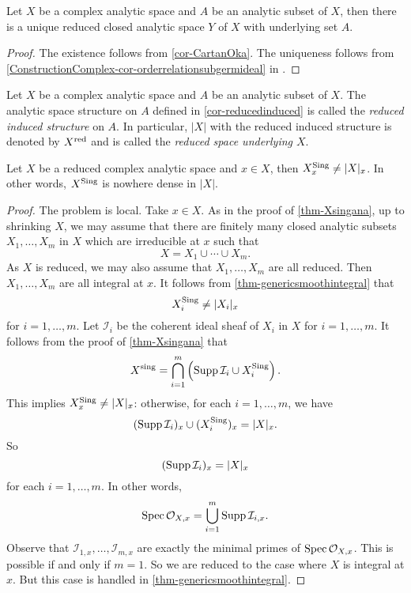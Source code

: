 \begin{corollary}\label{cor-reducedinduced}
    Let $X$ be a complex analytic space and $A$ be an analytic subset of $X$, then there is a unique reduced closed analytic space $Y$ of $X$ with underlying set $A$.
\end{corollary}
\begin{proof}
    The existence follows from \cref{cor-CartanOka}. The uniqueness follows from \cref{ConstructionComplex-cor-orderrelationsubgermideal} in .
\end{proof}

\begin{definition}
    Let $X$ be a complex analytic space and $A$ be an analytic subset of $X$. The analytic space structure on $A$ defined in \cref{cor-reducedinduced} is called the \emph{reduced induced structure} on $A$. In particular, $|X|$ with the reduced induced structure is denoted by $X^{\operatorname{red}}$ and is called the \emph{reduced space underlying $X$}.
\end{definition}

\begin{thm}\label{thm-gensmooth}
    Let $X$ be a reduced complex analytic space and $x\in X$, then $X^{\operatorname{Sing}}_x\neq |X|_x$. In other words, $X^{\operatorname{Sing}}$ is nowhere dense in $|X|$. 
\end{thm}
\begin{proof}
    The problem is local. Take $x\in X$. As in the proof of \cref{thm-Xsingana}, up to shrinking $X$, we may assume that there are finitely many closed analytic subsets $X_1,\ldots,X_m$ in $X$ which are irreducible at $x$ such that 
    \[
        X=X_1\cup\cdots\cup X_m.  
    \]
    As $X$ is reduced, we may also assume that $X_1,\ldots,X_m$ are all reduced. Then $X_1,\ldots,X_m$ are all integral at $x$. It follows from \cref{thm-genericsmoothintegral} that 
    \[
        X_i^{\operatorname{Sing}}\neq |X_i|_x
    \]
    for $i=1,\ldots,m$.
    Let $\mathcal{I}_i$ be the coherent ideal sheaf of $X_i$ in $X$ for $i=1,\ldots,m$. It follows from the proof of \cref{thm-Xsingana} that
    \[
        X^{\operatorname{sing}}=\bigcap_{i=1}^m \left(\operatorname{Supp} \mathcal{I}_i \cup X_i^{\operatorname{Sing}} \right). 
    \]
    This implies $X^{\operatorname{Sing}}_x\neq |X|_x$: otherwise, for each $i=1,\ldots,m$, we have
    \[
        (\operatorname{Supp} \mathcal{I}_i)_x\cup (X_i^{\operatorname{Sing}})_x=|X|_x.  
    \]
    So
    \[
        (\operatorname{Supp} \mathcal{I}_i)_x= |X|_x
    \]
    for each $i=1,\ldots,m$. In other words,
    \[
        \operatorname{Spec} \mathcal{O}_{X,x}=\bigcup_{i=1}^m \operatorname{Supp}\mathcal{I}_{i,x}.
    \]
    Observe that $\mathcal{I}_{1,x},\ldots,\mathcal{I}_{m,x}$ are exactly the minimal primes of $\operatorname{Spec}   \mathcal{O}_{X,x}$. This is possible if and only if $m=1$. So we are reduced to the case where $X$ is integral at $x$. But this case is handled in \cref{thm-genericsmoothintegral}.
\end{proof}

